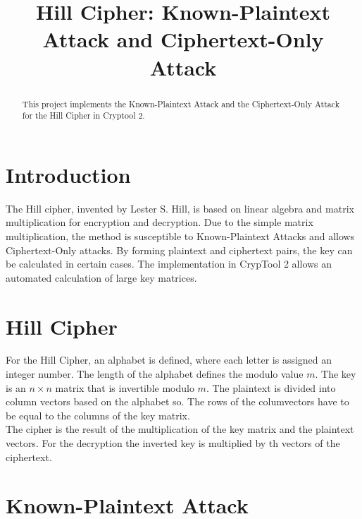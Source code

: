 \documentclass[conference]{IEEEtran}
\begin{document}
\title{Hill Cipher: Known-Plaintext Attack and Ciphertext-Only Attack\\}

\author{
}

\maketitle

\begin{abstract}
This project implements the Known-Plaintext Attack and the Ciphertext-Only Attack for the Hill Cipher in Cryptool 2. 
\end{abstract}

\section{Introduction}
The Hill cipher, invented by Lester S. Hill, is based on linear algebra and matrix multiplication for encryption and decryption. 
Due to the simple matrix multiplication, the method is susceptible to Known-Plaintext Attacks and allows Ciphertext-Only 
attacks. By forming plaintext and ciphertext pairs, the key can be calculated in certain cases. The implementation in CrypTool 2 
allows an automated calculation of large key matrices.

\section{Hill Cipher}

For the Hill Cipher, an alphabet is defined, where each letter is assigned an integer number. The length of the alphabet defines the modulo value \( m \). The key is an \( n \times n \) matrix that is invertible modulo \( m \). The plaintext is divided into column vectors based on the alphabet so. The rows of the columvectors have to be equal to the columns of the key matrix.\\
The cipher is the result of the multiplication of the key matrix and the plaintext vectors. For the decryption the inverted key is multiplied by th vectors of the ciphertext\cite{b1}.

\section{Known-Plaintext Attack}
\end{document}
